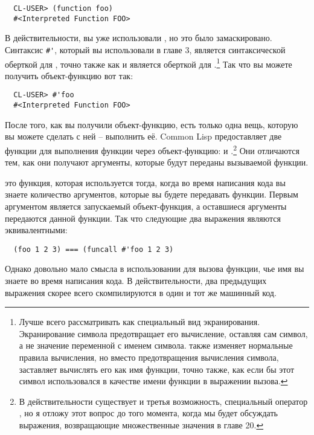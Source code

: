 \begin{verbatim}
  CL-USER> (function foo)
  #<Interpreted Function FOO>
\end{verbatim}

В действительности, вы уже использовали , но это было
замаскировано. Синтаксис \lstinline!#'!, который вы использовали в главе 3, является
синтаксической оберткой для , точно также как и  является оберткой
для .\footnote{Лучше всего рассматривать  как специальный вид
  экранирования.  Экранирование символа предотвращает его вычисление, оставляя сам символ,
  а не значение переменной с именем символа.  также изменяет нормальные
  правила вычисления, но вместо предотвращения вычисления символа, заставляет вычислять
  его как имя функции, точно также, как если бы этот символ использовался в качестве имени
  функции в выражении вызова.}  Так что вы можете получить объект-функцию вот так:

\begin{verbatim}
  CL-USER> #'foo
  #<Interpreted Function FOO>
\end{verbatim}

После того, как вы получили объект-функцию, есть только одна вещь, которую вы можете
сделать с ней -- выполнить её. Common Lisp предоставляет две функции для выполнения
функции через объект-функцию:  и .\footnote{В действительности
  существует и третья возможность, специальный оператор , но я
  отложу этот вопрос до того момента, когда мы будет обсуждать выражения, возвращающие
  множественные значения в главе 20.} Они отличаются тем, как они получают аргументы,
которые будут переданы вызываемой функции.

 это функция, которая используется тогда, когда во время написания кода вы
знаете количество аргументов, которые вы будете передавать функции.  Первым аргументом
 является запускаемый объект-функция, а оставшиеся аргументы передаются
данной функции.  Так что следующие два выражения являются эквивалентными:

\begin{verbatim}
  (foo 1 2 3) === (funcall #'foo 1 2 3)
\end{verbatim}

Однако довольно мало смысла в использовании  для вызова функции, чье имя вы
знаете во время написания кода.  В действительности, два предыдущих выражения скорее всего
скомпилируются в один и тот же машинный код.

